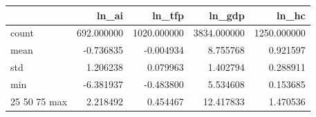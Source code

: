 \begin{tabular}{lrrrr}
\toprule
 & ln_ai & ln_tfp & ln_gdp & ln_hc \\
\midrule
count & 692.000000 & 1020.000000 & 3834.000000 & 1250.000000 \\
mean & -0.736835 & -0.004934 & 8.755768 & 0.921597 \\
std & 1.206238 & 0.079963 & 1.402794 & 0.288911 \\
min & -6.381937 & -0.483800 & 5.534608 & 0.153685 \\
25%
50%
75%
max & 2.218492 & 0.454467 & 12.417833 & 1.470536 \\
\bottomrule
\end{tabular}
